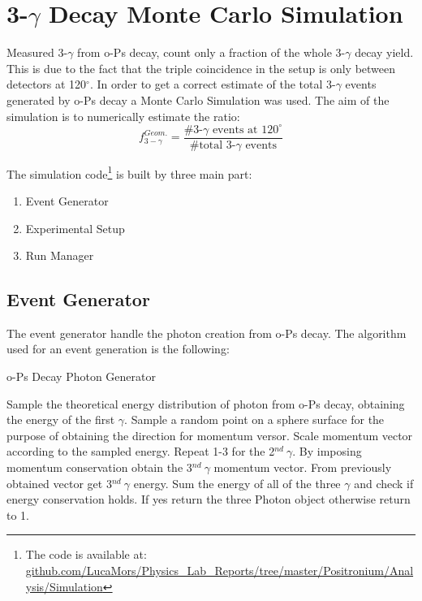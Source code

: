 \section*{3-$\gamma$ Decay Monte Carlo Simulation}

Measured 3-$\gamma$ from o-Ps decay, count only a fraction of the whole 3-$\gamma$ decay yield. This is due to the fact that the triple coincidence in the setup is only between detectors at 120$^\circ$. In order to get a correct estimate of the total 3-$\gamma$ events generated by o-Ps decay a Monte Carlo Simulation was used. The aim of the simulation is to numerically estimate the ratio:
\begin{equation*}
 f_{3-\gamma}^{Geom.} = \dfrac{\#\text{3-}\gamma\text{ events at 120}^\circ}{\#\text{total 3-}\gamma \text{ events}}
\end{equation*}

The simulation code\footnote{\noindent The code is available at:\\ \href{https://github.com/LucaMors/Physics_Lab_Reports/tree/master/Positronium/Analysis/Simulation}{github.com/LucaMors/Physics\_Lab\_Reports/tree/master/Positronium/Analysis/Simulation}} is built by three main part:
\begin{enumerate}
\item Event Generator
\item Experimental Setup
\item Run Manager
\end{enumerate}

\subsection*{Event Generator}

The event generator handle the photon creation from o-Ps decay. The algorithm used for an event generation is the following:
\begin{algorithm}
\caption{o-Ps Decay Photon Generator}\label{euclid}
\begin{algorithmic}[1]
\State Sample the theoretical energy distribution of photon from o-Ps decay, obtaining the energy of the first $\gamma$.
\State Sample a random point on a sphere surface for the purpose of obtaining the direction for momentum versor.
\State Scale momentum vector according to the sampled energy.
\State Repeat 1-3 for the 2$^{nd}\ \gamma$.
\State By imposing momentum conservation obtain the 3$^{nd}\ \gamma$ momentum vector.
\State From previously obtained vector get 3$^{nd}\ \gamma$ energy.
\State Sum the energy of all of the three $\gamma$ and check if energy conservation holds. If yes return the three Photon object otherwise return to 1.
\end{algorithmic}
\end{algorithm}

